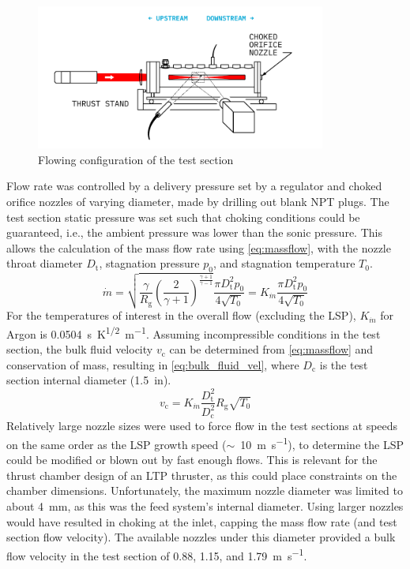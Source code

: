         \begin{figure}[h]
            \centering
            \includegraphics[width=0.85\textwidth]{assets/5 results/finalsetup_flowing}
            \caption{Flowing configuration of the test section}
            \label{fig:finalsetup_flowing}
        \end{figure}

        Flow rate was controlled by a delivery pressure set by a regulator and choked orifice nozzles of varying diameter, made by drilling out blank NPT plugs. The test section static pressure was set such that choking conditions could be guaranteed, i.e., the ambient pressure was lower than the sonic pressure. This allows the calculation of the mass flow rate using \autoref{eq:massflow}, with the nozzle throat diameter $D_\mathrm{t}$, stagnation pressure $p_0$, and stagnation temperature $T_0$. 
        \begin{equation} \label{eq:massflow}
            \dot{m} = \sqrt{\frac{\gamma}{R_\mathrm{g}}\left(\frac{2}{\gamma+1}\right)^\frac{\gamma+1}{\gamma-1}}\frac{\pi D_\mathrm{t}^2p_0}{4\sqrt{T_0}} = K_{\dot{m}}\frac{\pi D_\mathrm{t}^2p_0}{4\sqrt{T_0}}
        \end{equation}
        For the temperatures of interest in the overall flow (excluding the LSP), $K_{\dot{m}}$ for Argon is \qty{0.0504}{s.K^{1/2}.m^{-1}}. Assuming incompressible conditions in the test section, the bulk fluid velocity $v_\mathrm{c}$ can be determined from \autoref{eq:massflow} and conservation of mass, resulting in \autoref{eq:bulk_fluid_vel}, where $D_\mathrm{c}$ is the test section internal diameter (\qty{1.5}{in}).
        \begin{equation} \label{eq:bulk_fluid_vel}
            v_\mathrm{c} = K_{\dot{m}}\frac{D_\mathrm{t}^2}{D_\mathrm{c}^2}R_\mathrm{g}\sqrt{T_0}
        \end{equation}
        Relatively large nozzle sizes were used to force flow in the test sections at speeds on the same order as the LSP growth speed ($\sim$~\qty{10}{m.s^{-1}}), to determine the LSP could be modified or blown out by fast enough flows. This is relevant for the thrust chamber design of an LTP thruster, as this could place constraints on the chamber dimensions. Unfortunately, the maximum nozzle diameter was limited to about \qty{4}{mm}, as this was the feed system's internal diameter. Using larger nozzles would have resulted in choking at the inlet, capping the mass flow rate (and test section flow velocity). The available nozzles under this diameter provided a bulk flow velocity in the test section of 0.88, 1.15, and \qty{1.79}{m.s^{-1}}.

